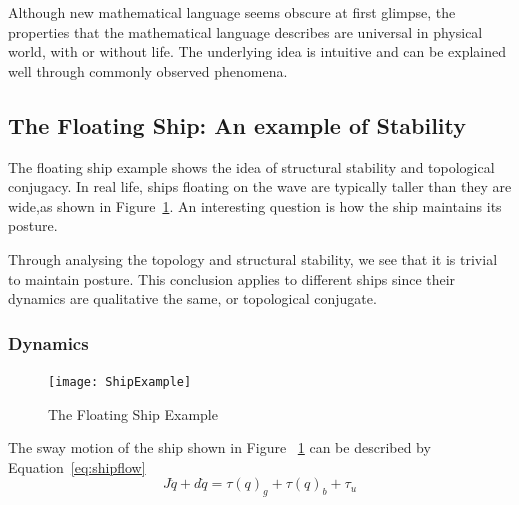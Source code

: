 %
%
%
%
%




Although new mathematical language seems obscure at first glimpse, the properties that the mathematical language describes are universal in physical world, with or without life.
The underlying idea is intuitive and can be explained well through commonly observed phenomena.



\subsection{The Floating Ship: An example of Stability}
The floating ship  example shows the idea of structural stability and topological conjugacy.
In real life, ships floating on the wave are typically taller than they are wide,as shown in Figure~\ref{fig:ShipFloating}.
An interesting  question is how the ship maintains its posture.

Through analysing the topology and structural stability, we see that it is trivial to maintain posture.
This conclusion applies to different ships since their dynamics are qualitative the same, or topological conjugate.


\subsubsection*{Dynamics}

\begin{figure}[!htbp]
  \begin{center}
    \texttt{[image: ShipExample]}
    \caption{The Floating Ship Example}
    \label{fig:ShipFloating}
  \end{center}
\end{figure}

The sway motion of the ship shown in Figure ~\ref{fig:ShipFloating} can be described by Equation~\ref{eq:shipflow}
\begin{equation}
\label{eq:shipflow}
J\ddot{q}+d\dot{q}=\tau(q)_{g}+\tau(q)_{b}+\tau_{u}
\end{equation}


